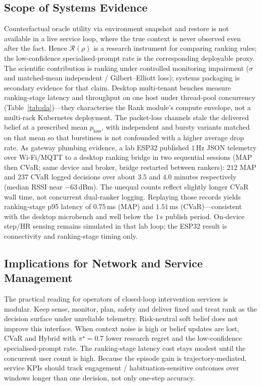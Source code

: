 \documentclass[journal]{IEEEtran}
\begin{document}
\subsection{Scope of Systems Evidence}
\label{sec:scope}
Counterfactual oracle utility via environment snapshot and restore is not available in a live service loop, where the true context is never observed even after the fact.
Hence \(\mathcal{R}(\rho)\) is a research instrument for comparing ranking rules; the low-confidence specialised-prompt rate is the corresponding deployable proxy.
The scientific contribution is ranking under controlled monitoring impairment (\(\sigma\) and matched-mean independent / Gilbert--Elliott loss); systems packaging is secondary evidence for that claim.
Desktop multi-tenant benches measure ranking-stage latency and throughput on one host under thread-pool concurrency (Table~\ref{tab:sla})---they characterise the Rank module's compute envelope, not a multi-rack Kubernetes deployment.
The packet-loss channels stale the delivered belief at a prescribed mean \(p_{\mathrm{loss}}\), with independent and bursty variants matched on that mean so that burstiness is not confounded with a higher average drop rate.
As gateway plumbing evidence, a lab ESP32 published \(1\)\,Hz JSON telemetry over Wi‑Fi/MQTT to a desktop ranking bridge in two sequential sessions (MAP then CVaR; same device and broker, bridge restarted between rankers): \(212\) MAP and \(237\) CVaR logged decisions over about \(3.5\) and \(4.0\) minutes respectively (median RSSI near \(-63\)\,dBm).
The unequal counts reflect slightly longer CVaR wall time, not concurrent dual-ranker logging.
Replaying those records yields ranking-stage p95 latency of \(0.75\)\,ms (MAP) and \(1.51\)\,ms (CVaR)---consistent with the desktop microbench and well below the \(1\)\,s publish period.
On-device step/HR sensing remains simulated in that lab loop; the ESP32 result is connectivity and ranking-stage timing only.

\subsection{Implications for Network and Service Management}
The practical reading for operators of closed-loop intervention services is modular. Keep sense, monitor, plan, safety and deliver fixed and treat rank as the decision surface under unreliable telemetry.
Risk-neutral soft belief does not improve this interface. When context noise is high or belief updates are lost, CVaR and Hybrid with \(\pi^\star=0.7\) lower research regret and the low-confidence specialised-prompt rate. The ranking-stage latency cost stays modest until the concurrent user count is high.
Because the episode gain is trajectory-mediated, service KPIs should track engagement / habituation-sensitive outcomes over windows longer than one decision, not only one-step accuracy.
\end{document}
